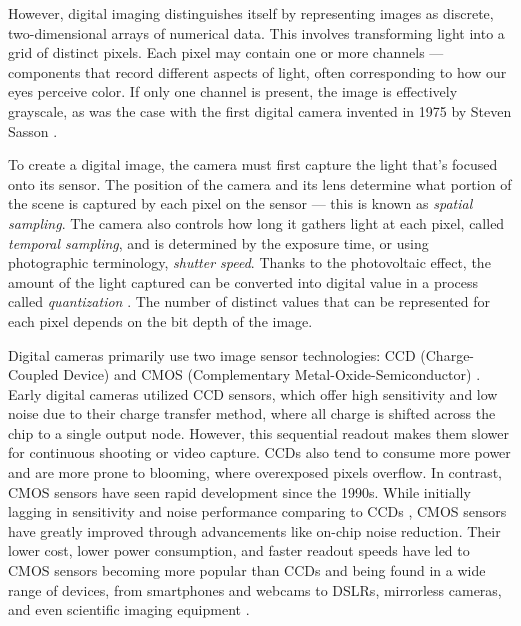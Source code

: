 However, digital imaging distinguishes itself by representing images as discrete, two-dimensional arrays of numerical data. This involves transforming light into a grid of distinct pixels. Each pixel may contain one or more channels — components that record different aspects of light, often corresponding to how our eyes perceive color. If only one channel is present, the image is effectively grayscale, as was the case with the first digital camera invented in 1975 by Steven Sasson \cite{oregan2018innovation}.

To create a digital image, the camera must first capture the light that's focused onto its sensor. The position of the camera and its lens determine what portion of the scene is captured by each pixel on the sensor — this is known as \emph{spatial sampling}. The camera also controls how long it gathers light at each pixel, called \emph{temporal sampling}, and is determined by the exposure time, or using photographic terminology, \emph{shutter speed}. Thanks to the photovoltaic effect, the amount of the light captured can be converted into digital value in a process called \emph{quantization} \cite{burger2022digital-image-processing}. The number of distinct values that can be represented for each pixel depends on the bit depth of the image.

Digital cameras primarily use two image sensor technologies: CCD (Charge-Coupled Device) \cite{theuwissen2005solid} and CMOS (Complementary Metal-Oxide-Semiconductor) \cite{fossum1997cmos}. Early digital cameras utilized CCD sensors, which offer high sensitivity and low noise due to their charge transfer method, where all charge is shifted across the chip to a single output node. However, this sequential readout makes them slower for continuous shooting or video capture. CCDs also tend to consume more power and are more prone to blooming, where overexposed pixels overflow. In contrast, CMOS sensors have seen rapid development since the 1990s. While initially lagging in sensitivity and noise performance comparing to CCDs \cite{magnan2003detection-ccd-cmos}, CMOS sensors have greatly improved through advancements like on-chip noise reduction. Their lower cost, lower power consumption, and faster readout speeds have led to CMOS sensors becoming more popular than CCDs and being found in a wide range of devices, from smartphones and webcams to DSLRs, mirrorless cameras, and even scientific imaging equipment \cite{holst2007cmos-ccd}.

